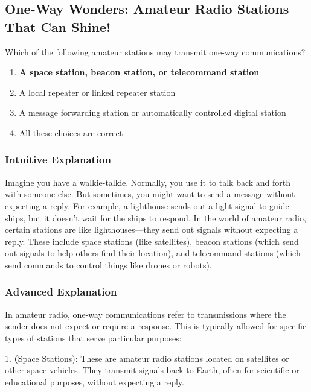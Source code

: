 \subsection{One-Way Wonders: Amateur Radio Stations That Can Shine!}

\begin{tcolorbox}[colback=gray!10!white,colframe=black!75!black,title=E1D12] Which of the following amateur stations may transmit one-way communications?
    \begin{enumerate}[label=\Alph*.]
        \item \textbf{A space station, beacon station, or telecommand station}
        \item A local repeater or linked repeater station
        \item A message forwarding station or automatically controlled digital station
        \item All these choices are correct
    \end{enumerate}
\end{tcolorbox}

\subsubsection{Intuitive Explanation}
Imagine you have a walkie-talkie. Normally, you use it to talk back and forth with someone else. But sometimes, you might want to send a message without expecting a reply. For example, a lighthouse sends out a light signal to guide ships, but it doesn't wait for the ships to respond. In the world of amateur radio, certain stations are like lighthouses—they send out signals without expecting a reply. These include space stations (like satellites), beacon stations (which send out signals to help others find their location), and telecommand stations (which send commands to control things like drones or robots).

\subsubsection{Advanced Explanation}
In amateur radio, one-way communications refer to transmissions where the sender does not expect or require a response. This is typically allowed for specific types of stations that serve particular purposes:

1. \textbf(Space Stations): These are amateur radio stations located on satellites or other space vehicles. They transmit signals back to Earth, often for scientific or educational purposes, without expecting a reply.

